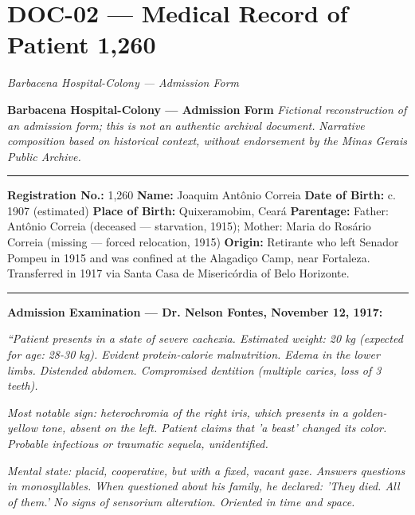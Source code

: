 \section*{\textbf{DOC-02} --- Medical Record of Patient 1,260}

\noindent \textit{Barbacena Hospital-Colony --- Admission Form}

\noindent \textbf{Barbacena Hospital-Colony --- Admission Form}
\textit{Fictional reconstruction of an admission form; this is not an authentic archival document.}
\textit{Narrative composition based on historical context, without endorsement by the Minas Gerais Public Archive.}

\vspace{0.5em}\noindent\rule{\textwidth}{0.5pt}\vspace{0.5em}

\noindent \textbf{Registration No.:} 1,260  
\textbf{Name:} Joaquim Antônio Correia  
\textbf{Date of Birth:} c. 1907 (estimated)  
\textbf{Place of Birth:} Quixeramobim, Ceará  
\textbf{Parentage:} Father: Antônio Correia (deceased --- starvation, 1915); Mother: Maria do Rosário Correia (missing --- forced relocation, 1915)  
\textbf{Origin:} Retirante who left Senador Pompeu in 1915 and was confined at the Alagadiço Camp, near Fortaleza. Transferred in 1917 via Santa Casa de Misericórdia of Belo Horizonte.

\vspace{0.5em}\noindent\rule{\textwidth}{0.5pt}\vspace{0.5em}

\noindent \textbf{Admission Examination --- Dr. Nelson Fontes, November 12, 1917:}

\noindent \textit{\textquotedblleft{}Patient presents in a state of severe cachexia. Estimated weight: 20 kg (expected for age: 28-30 kg). Evident protein-calorie malnutrition. Edema in the lower limbs. Distended abdomen. Compromised dentition (multiple caries, loss of 3 teeth).}

\noindent \textit{Most notable sign: heterochromia of the right iris, which presents in a golden-yellow tone, absent on the left. Patient claims that 'a beast' changed its color. Probable infectious or traumatic sequela, unidentified.}

\noindent \textit{Mental state: placid, cooperative, but with a fixed, vacant gaze. Answers questions in monosyllables. When questioned about his family, he declared: 'They died. All of them.' No signs of sensorium alteration. Oriented in time and space.}


